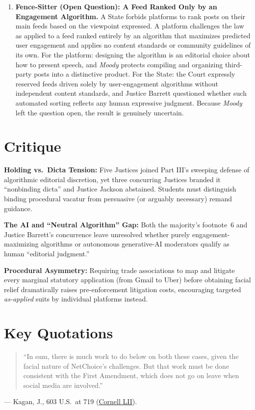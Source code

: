 \documentclass[12pt]{article}
\begin{document}
\begin{enumerate}
\item \textbf{Fence-Sitter (Open Question): A Feed Ranked Only by an Engagement Algorithm.} A State forbids platforms to rank posts on their main feeds based on the viewpoint expressed. A platform challenges the law as applied to a feed ranked entirely by an algorithm that maximizes predicted user engagement and applies no content standards or community guidelines of its own. For the platform: designing the algorithm is an editorial choice about how to present speech, and \textit{Moody} protects compiling and organizing third-party posts into a distinctive product. For the State: the Court expressly reserved feeds driven solely by user-engagement algorithms without independent content standards, and Justice Barrett questioned whether such automated sorting reflects any human expressive judgment. Because \textit{Moody} left the question open, the result is genuinely uncertain.

\end{enumerate}

\section{Critique}
\textbf{Holding vs.\ Dicta Tension:} Five Justices joined Part III's sweeping defense of algorithmic editorial discretion, yet three concurring Justices branded it ``nonbinding dicta'' and Justice Jackson abstained. Students must distinguish binding procedural vacatur from persuasive (or arguably necessary) remand guidance.

\textbf{The AI and ``Neutral Algorithm'' Gap:} Both the majority's footnote~6 and Justice Barrett's concurrence leave unresolved whether purely engagement-maximizing algorithms or autonomous generative-AI moderators qualify as human ``editorial judgment.''

\textbf{Procedural Asymmetry:} Requiring trade associations to map and litigate every marginal statutory application (from Gmail to Uber) before obtaining facial relief dramatically raises pre-enforcement litigation costs, encouraging targeted \emph{as-applied} suits by individual platforms instead.

\section{Key Quotations}
\begin{quote}
``In sum, there is much work to do below on both these cases, given the facial nature of NetChoice's challenges. But that work must be done consistent with the First Amendment, which does not go on leave when social media are involved.''
\end{quote}
\noindent --- Kagan, J., 603 U.S.\ at 719 (\href{https://www.law.cornell.edu/supremecourt/text/22-277}{Cornell LII}).
\end{document}
